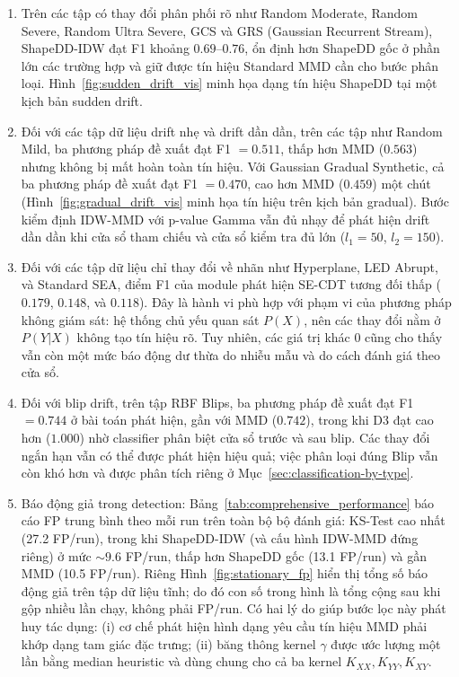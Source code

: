 \begin{enumerate}
	\item Trên các tập có thay đổi phân phối rõ như Random Moderate, Random Severe, Random Ultra Severe, GCS và GRS (Gaussian Recurrent Stream), ShapeDD-IDW đạt F1 khoảng $0.69$--$0.76$, ổn định hơn ShapeDD gốc ở phần lớn các trường hợp và giữ được tín hiệu Standard MMD cần cho bước phân loại. Hình~\ref{fig:sudden_drift_vis} minh họa dạng tín hiệu ShapeDD tại một kịch bản sudden drift.
	\item Đối với các tập dữ liệu drift nhẹ và drift dần dần, trên các tập như Random Mild, ba phương pháp đề xuất đạt F1 $= 0.511$, thấp hơn MMD ($0.563$) nhưng không bị mất hoàn toàn tín hiệu. Với Gaussian Gradual Synthetic, cả ba phương pháp đề xuất đạt F1 $= 0.470$, cao hơn MMD ($0.459$) một chút (Hình~\ref{fig:gradual_drift_vis} minh họa tín hiệu trên kịch bản gradual). Bước kiểm định IDW-MMD với p-value Gamma vẫn đủ nhạy để phát hiện drift dần dần khi cửa sổ tham chiếu và cửa sổ kiểm tra đủ lớn ($l_1 = 50$, $l_2 = 150$).
	\item Đối với các tập dữ liệu chỉ thay đổi về nhãn như Hyperplane, LED Abrupt, và Standard SEA, điểm F1 của module phát hiện SE-CDT tương đối thấp ($0.179$, $0.148$, và $0.118$). Đây là hành vi phù hợp với phạm vi của phương pháp không giám sát: hệ thống chủ yếu quan sát $P(X)$, nên các thay đổi nằm ở $P(Y|X)$ không tạo tín hiệu rõ. Tuy nhiên, các giá trị khác 0 cũng cho thấy vẫn còn một mức báo động dư thừa do nhiễu mẫu và do cách đánh giá theo cửa sổ.
	\item Đối với blip drift, trên tập RBF Blips, ba phương pháp đề xuất đạt F1 $= 0.744$ ở bài toán phát hiện, gần với MMD ($0.742$), trong khi D3 đạt cao hơn ($1.000$) nhờ classifier phân biệt cửa sổ trước và sau blip. Các thay đổi ngắn hạn vẫn có thể được phát hiện hiệu quả; việc phân loại đúng Blip vẫn còn khó hơn và được phân tích riêng ở Mục~\ref{sec:classification-by-type}.
	\item Báo động giả trong detection:
	      Bảng~\ref{tab:comprehensive_performance} báo cáo FP trung bình theo mỗi run trên toàn bộ bộ đánh giá: KS-Test cao nhất (27.2 FP/run), trong khi ShapeDD-IDW (và cấu hình IDW-MMD đứng riêng) ở mức $\sim 9.6$ FP/run, thấp hơn ShapeDD gốc (13.1 FP/run) và gần MMD (10.5 FP/run). Riêng Hình~\ref{fig:stationary_fp} hiển thị tổng số báo động giả trên tập dữ liệu tĩnh; do đó con số trong hình là tổng cộng sau khi gộp nhiều lần chạy, không phải FP/run. Có hai lý do giúp bước lọc này phát huy tác dụng: (i) cơ chế phát hiện hình dạng yêu cầu tín hiệu MMD phải khớp dạng tam giác đặc trưng; (ii) băng thông kernel $\gamma$ được ước lượng một lần bằng median heuristic và dùng chung cho cả ba kernel $K_{XX}, K_{YY}, K_{XY}$.
\end{enumerate}


